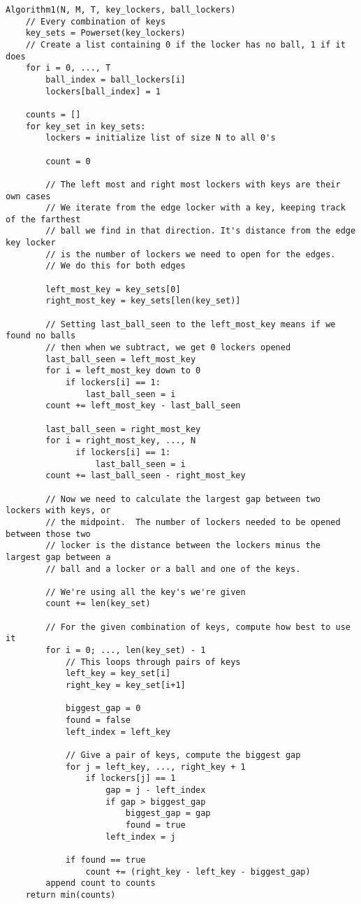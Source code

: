 \documentclass{article}
\begin{document}
\begin{verbatim}
Algorithm1(N, M, T, key_lockers, ball_lockers)
    // Every combination of keys
    key_sets = Powerset(key_lockers)
    // Create a list containing 0 if the locker has no ball, 1 if it does
    for i = 0, ..., T
        ball_index = ball_lockers[i]
        lockers[ball_index] = 1

    counts = []
    for key_set in key_sets:
        lockers = initialize list of size N to all 0's

        count = 0

        // The left most and right most lockers with keys are their own cases
        // We iterate from the edge locker with a key, keeping track of the farthest
        // ball we find in that direction. It's distance from the edge key locker
        // is the number of lockers we need to open for the edges.
        // We do this for both edges

        left_most_key = key_sets[0]
        right_most_key = key_sets[len(key_set)]

        // Setting last_ball_seen to the left_most_key means if we found no balls
        // then when we subtract, we get 0 lockers opened
        last_ball_seen = left_most_key
        for i = left_most_key down to 0
            if lockers[i] == 1:
                last_ball_seen = i
        count += left_most_key - last_ball_seen

        last_ball_seen = right_most_key
        for i = right_most_key, ..., N
              if lockers[i] == 1:
                  last_ball_seen = i
        count += last_ball_seen - right_most_key

        // Now we need to calculate the largest gap between two lockers with keys, or
        // the midpoint.  The number of lockers needed to be opened between those two
        // locker is the distance between the lockers minus the largest gap between a
        // ball and a locker or a ball and one of the keys.

        // We're using all the key's we're given
        count += len(key_set)

        // For the given combination of keys, compute how best to use it
        for i = 0; ..., len(key_set) - 1
            // This loops through pairs of keys
            left_key = key_set[i]
            right_key = key_set[i+1]

            biggest_gap = 0
            found = false
            left_index = left_key

            // Give a pair of keys, compute the biggest gap
            for j = left_key, ..., right_key + 1
                if lockers[j] == 1
                    gap = j - left_index
                    if gap > biggest_gap
                        biggest_gap = gap
                        found = true
                    left_index = j

            if found == true
                count += (right_key - left_key - biggest_gap)
        append count to counts
    return min(counts)
\end{verbatim}
\end{document}
